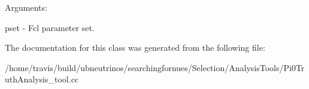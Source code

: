 Arguments\+:

pset -\/ Fcl parameter set. 

The documentation for this class was generated from the following file\+:\begin{DoxyCompactItemize}
\item 
/home/travis/build/ubneutrinos/searchingfornues/\+Selection/\+Analysis\+Tools/Pi0\+Truth\+Analysis\+\_\+tool.\+cc\end{DoxyCompactItemize}
